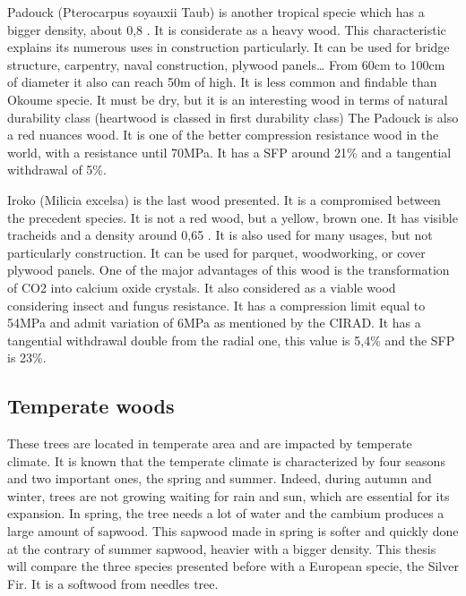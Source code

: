 Padouck (Pterocarpus soyauxii Taub) is another tropical specie which has a bigger density, about 0,8 \parencite{Reference7}. It is considerate as a heavy wood. This characteristic explains its numerous uses in construction particularly. It can be used for bridge structure, carpentry, naval construction, plywood panels…   From 60\si{\centi\meter} to 100\si{\centi\meter} of diameter it also can reach 50\si{\meter} of high. It is less common and findable than Okoume specie. It must be dry, but it is an interesting wood in terms of natural durability class (heartwood is classed in first durability class)
The Padouck is also a red nuances wood. It is one of the better compression resistance wood in the world, with a resistance until 70\si{\mega\pascal}. It has a SFP around 21\% and a tangential withdrawal of 5\%.

Iroko (Milicia excelsa) is the last wood presented. It is a compromised between the precedent species. It is not a red wood, but a yellow, brown one. It has visible tracheids and a density around 0,65 \parencite{Reference7} . It is also used for many usages, but not particularly construction. It can be used for parquet, woodworking, or cover plywood panels. One of the major advantages of this wood is the transformation of CO2 into calcium oxide crystals. It also considered as a viable wood considering insect and fungus resistance. It has a compression limit equal to 54\si{\mega\pascal} and admit variation of 6\si{\mega\pascal} as mentioned by the CIRAD. It has a tangential withdrawal double from the radial one, this value is 5,4\% and the SFP is 23\%.



\subsection{Temperate woods}

These trees are located in temperate area and are impacted by temperate climate. It is known that the temperate climate is characterized by four seasons and two important ones, the spring and summer. Indeed, during autumn and winter, trees are not growing waiting for rain and sun, which are essential for its expansion. In spring, the tree needs a lot of water and the cambium produces a large amount of sapwood. This sapwood made in spring is softer and quickly done at the contrary of summer sapwood, heavier with a bigger density. This thesis will compare the three species presented before with a European specie, the Silver Fir. It is a softwood from needles tree. 

